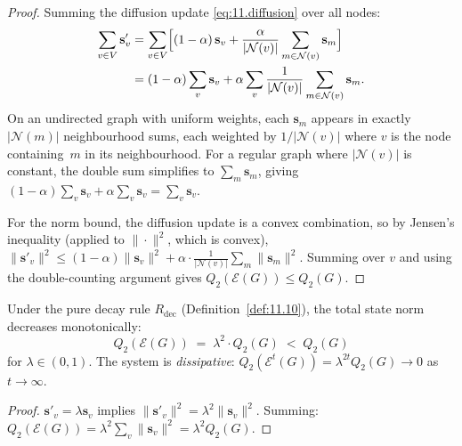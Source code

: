\begin{proof}
Summing the diffusion update \eqref{eq:11.diffusion} over all nodes:
\begin{align*}
  \sum_{v \in V} \mathbf{s}'_v
  &= \sum_{v \in V}
     \Bigl[
       (1 - \alpha)\,\mathbf{s}_v
       + \frac{\alpha}{|\mathcal{N}(v)|}
         \sum_{m \in \mathcal{N}(v)} \mathbf{s}_m
     \Bigr] \\
  &= (1 - \alpha) \sum_{v} \mathbf{s}_v
     + \alpha \sum_{v}
       \frac{1}{|\mathcal{N}(v)|}
       \sum_{m \in \mathcal{N}(v)} \mathbf{s}_m.
\end{align*}
On an undirected graph with uniform weights, each $\mathbf{s}_m$
appears in exactly $|\mathcal{N}(m)|$ neighbourhood sums, each
weighted by $1/|\mathcal{N}(v)|$ where $v$ is the node containing~$m$
in its neighbourhood.  For a regular graph where $|\mathcal{N}(v)|$ is
constant, the double sum simplifies to $\sum_m \mathbf{s}_m$, giving
$(1 - \alpha)\sum_v \mathbf{s}_v + \alpha \sum_v \mathbf{s}_v
= \sum_v \mathbf{s}_v$.

For the norm bound, the diffusion update is a convex combination,
so by Jensen's inequality (applied to $\|\cdot\|^2$, which is
convex), $\|\mathbf{s}'_v\|^2 \leq (1-\alpha)\|\mathbf{s}_v\|^2 +
\alpha \cdot \tfrac{1}{|\mathcal{N}(v)|}\sum_m \|\mathbf{s}_m\|^2$.
Summing over $v$ and using the double-counting argument gives
$Q_2(\mathcal{E}(G)) \leq Q_2(G)$.
\end{proof}

\begin{theorem}
\label{thm:11.9}
Under the pure decay rule $R_{\mathrm{dec}}$
(Definition~\ref{def:11.10}), the total state norm decreases
monotonically:
\begin{equation}
\label{eq:11.decay_dissipation}
  Q_2(\mathcal{E}(G))
  \;=\;
  \lambda^2 \cdot Q_2(G)
  \;<\;
  Q_2(G)
\end{equation}
for $\lambda \in (0,1)$.  The system is \emph{dissipative}:
$Q_2(\mathcal{E}^t(G)) = \lambda^{2t} Q_2(G) \to 0$ as
$t \to \infty$.
\end{theorem}

\begin{proof}
$\mathbf{s}'_v = \lambda \mathbf{s}_v$ implies $\|\mathbf{s}'_v\|^2
= \lambda^2 \|\mathbf{s}_v\|^2$.  Summing: $Q_2(\mathcal{E}(G)) =
\lambda^2 \sum_v \|\mathbf{s}_v\|^2 = \lambda^2 Q_2(G)$.
\end{proof}

